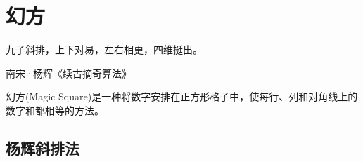\chapter{幻方}
\label{chap:magic-square}

\epigraph{九子斜排，上下对易，左右相更，四维挺出。}{南宋·杨辉《续古摘奇算法》}

  幻方(Magic Square)是一种将数字安排在正方形格子中，使每行、列和对角线上的数字和都相等的方法。


\section{杨辉斜排法}
\label{sec:yanghui-method}

